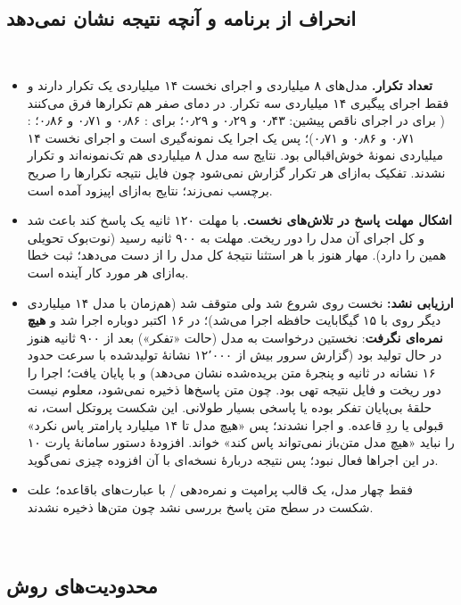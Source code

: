 ‫\documentclass[a4paper,12pt]{article}
\begin{document}
‫
‫\subsection{انحراف از برنامه و آنچه نتیجه نشان نمی‌دهد}
‫\begin{itemize}
‫\item \textbf{تعداد تکرار.} مدل‌های ۸ میلیاردی و اجرای نخست ۱۴ میلیاردی یک تکرار دارند و فقط اجرای پیگیری ۱۴ میلیاردی سه تکرار. در دمای صفر هم تکرارها فرق می‌کنند ( برای  در اجرای ناقص پیشین: ۰٫۴۳ و ۰٫۲۹ و ۰٫۲۹؛  برای : ۰٫۸۶ و ۰٫۷۱ و ۰٫۸۶؛ : ۰٫۷۱ و ۰٫۸۶ و ۰٫۷۱)؛ پس یک اجرا یک نمونه‌گیری است و اجرای نخست ۱۴ میلیاردی نمونهٔ خوش‌اقبالی بود. نتایج سه مدل ۸ میلیاردی هم تک‌نمونه‌اند و تکرار نشدند. تفکیک به‌ازای هر تکرار گزارش نمی‌شود چون فایل نتیجه تکرارها را صریح برچسب نمی‌زند؛ نتایج به‌ازای اپیزود آمده است.
‫\item \textbf{اشکال مهلت پاسخ در تلاش‌های نخست.} با مهلت ۱۲۰ ثانیه یک پاسخ کند باعث \texttt{} شد و \texttt{} کل اجرای آن مدل را دور ریخت. مهلت به ۹۰۰ ثانیه رسید (نوت‌بوک تحویلی همین را دارد). مهار هنوز با هر استثنا نتیجهٔ کل مدل را از دست می‌دهد؛ ثبت خطا به‌ازای هر مورد کار آینده است.
‫\item \textbf{ارزیابی نشد:}  نخست روی  شروع شد ولی متوقف شد (هم‌زمان با مدل ۱۴ میلیاردی دیگر روی  با ۱۵ گیگابایت حافظه اجرا می‌شد)؛ در ۱۶ اکتبر دوباره اجرا شد و \textbf{هیچ نمره‌ای نگرفت}: نخستین درخواست به مدل (حالت «تفکر») بعد از ۹۰۰ ثانیه هنوز در حال تولید بود (گزارش سرور بیش از ۱۲٬۰۰۰ نشانهٔ تولیدشده با سرعت حدود ۱۶ نشانه در ثانیه و پنجرهٔ متن بریده‌شده نشان می‌دهد) و با \texttt{} پایان یافت؛ \texttt{} اجرا را دور ریخت و فایل نتیجه تهی بود. چون متن پاسخ‌ها ذخیره نمی‌شود، معلوم نیست حلقهٔ بی‌پایان تفکر بوده یا پاسخی بسیار طولانی. این شکست پروتکل است، نه قبولی یا ردِ قاعده.  و  اجرا نشدند؛ پس «هیچ مدل تا ۱۴ میلیارد پارامتر پاس نکرد» را نباید «هیچ مدل متن‌باز نمی‌تواند پاس کند» خواند. افزودهٔ دستور سامانهٔ پارت ۱۰ در این اجراها فعال نبود؛ پس نتیجه دربارهٔ نسخه‌ای با آن افزوده چیزی نمی‌گوید.
‫\item فقط چهار مدل، یک قالب پرامپت و نمره‌دهی / با عبارت‌های باقاعده؛ علت شکست در سطح متن پاسخ بررسی نشد چون متن‌ها ذخیره نشدند.
‫\end{itemize}
‫\subsection{محدودیت‌های روش}
\end{document}

